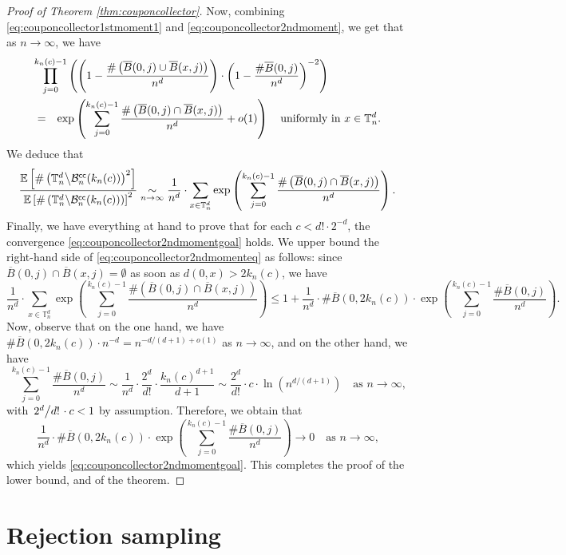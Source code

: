 \documentclass[a4paper,11pt]{article}
\begin{document}
\begin{proof}[Proof of Theorem \ref{thm:couponcollector}]
Now, combining \eqref{eq:couponcollector1stmoment1} and \eqref{eq:couponcollector2ndmoment}, we get that as $n\to\infty$, we have
\begin{eqnarray*}
\lefteqn{\prod_{j=0}^{k_n(c)-1}\left(\left(1-\frac{\#\left(\overline{B}(0,j)\cup\overline{B}(x,j)\right)}{n^d}\right)\cdot\left(1-\frac{\#\overline{B}(0,j)}{n^d}\right)^{-2}\right)}\\
&=&\exp\left(\sum_{j=0}^{k_n(c)-1}\frac{\#\left(\overline{B}(0,j)\cap\overline{B}(x,j)\right)}{n^d}+o(1)\right)\quad\text{uniformly in $x\in\mathbb{T}_n^d$.}
\end{eqnarray*}
We deduce that
\begin{equation}\label{eq:couponcollector2ndmomenteq}
\frac{\mathbb{E}\left[\#\left(\mathbb{T}_n^d\middle\backslash\mathcal{B}_n^\mathsf{cc}(k_n(c))\right)^2\right]}{\mathbb{E}\left[\#\left(\mathbb{T}_n^d\middle\backslash\mathcal{B}_n^\mathsf{cc}(k_n(c))\right)\right]^2}\underset{n\to\infty}{\sim}\frac{1}{n^d}\cdot\sum_{x\in\mathbb{T}_n^d}\exp\left(\sum_{j=0}^{k_n(c)-1}\frac{\#\left(\overline{B}(0,j)\cap\overline{B}(x,j)\right)}{n^d}\right).
\end{equation}
Finally, we have everything at hand to prove that for each $c<d!\cdot2^{-d}$, the convergence \eqref{eq:couponcollector2ndmomentgoal} holds.
We upper bound the right-hand side of \eqref{eq:couponcollector2ndmomenteq} as follows: since $\overline{B}(0,j)\cap\overline{B}(x,j)=\emptyset$ as soon as $d(0,x)>2k_n(c)$, we have
\[\frac{1}{n^d}\cdot\sum_{x\in\mathbb{T}_n^d}\exp\left(\sum_{j=0}^{k_n(c)-1}\frac{\#\left(\overline{B}(0,j)\cap\overline{B}(x,j)\right)}{n^d}\right)\leq1+\frac{1}{n^d}\cdot\#\overline{B}(0,2k_n(c))\cdot\exp\left(\sum_{j=0}^{k_n(c)-1}\frac{\#\overline{B}(0,j)}{n^d}\right).\]
Now, observe that on the one hand, we have $\#\overline{B}(0,2k_n(c))\cdot n^{-d}=n^{-d/(d+1)+o(1)}$ as $n\to\infty$, and on the other hand, we have
\[\sum_{j=0}^{k_n(c)-1}\frac{\#\overline{B}(0,j)}{n^d}\sim\frac{1}{n^d}\cdot\frac{2^d}{d!}\cdot\frac{k_n(c)^{d+1}}{d+1}\sim\frac{2^d}{d!}\cdot c\cdot\ln\left(n^{d/(d+1)}\right)\quad\text{as $n\to\infty$,}\]
with $\left.2^d\middle/d!\right.\cdot c<1$ by assumption.
Therefore, we obtain that
\[\frac{1}{n^d}\cdot\#\overline{B}(0,2k_n(c))\cdot\exp\left(\sum_{j=0}^{k_n(c)-1}\frac{\#\overline{B}(0,j)}{n^d}\right)\longrightarrow0\quad\text{as $n\to\infty$,}\]
which yields \eqref{eq:couponcollector2ndmomentgoal}.
This completes the proof of the lower bound, and of the theorem.
\end{proof}


\section{Rejection sampling}\label{sec:rejectionsampling}
\end{document}
